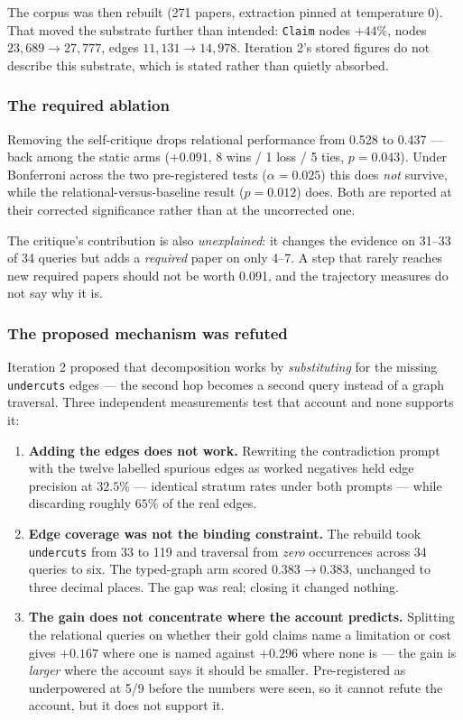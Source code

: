 The corpus was then rebuilt (271 papers, extraction pinned at temperature 0).
That moved the substrate further than intended: \texttt{Claim} nodes $+44\%$,
nodes $23{,}689 \rightarrow 27{,}777$, edges $11{,}131 \rightarrow 14{,}978$.
Iteration 2's stored figures do not describe this substrate, which is stated
rather than quietly absorbed.

\subsubsection*{The required ablation}

Removing the self-critique drops relational performance from 0.528 to 0.437 ---
back among the static arms ($+0.091$, 8 wins / 1 loss / 5 ties, $p = 0.043$).
Under Bonferroni across the two pre-registered tests ($\alpha = 0.025$) this
does \emph{not} survive, while the relational-versus-baseline result
($p = 0.012$) does. Both are reported at their corrected significance rather
than at the uncorrected one.

The critique's contribution is also \emph{unexplained}: it changes the
evidence on 31--33 of 34 queries but adds a \emph{required} paper on only
4--7. A step that rarely reaches new required papers should not be worth
0.091, and the trajectory measures do not say why it is.

\subsubsection*{The proposed mechanism was refuted}

Iteration 2 proposed that decomposition works by \emph{substituting} for the
missing \texttt{undercuts} edges --- the second hop becomes a second query
instead of a graph traversal. Three independent measurements test that
account and none supports it:

\begin{enumerate}[label=(\alph*)]
  \item \textbf{Adding the edges does not work.} Rewriting the contradiction
        prompt with the twelve labelled spurious edges as worked negatives held
        edge precision at $32.5\%$ --- identical stratum rates under both
        prompts --- while discarding roughly $65\%$ of the real edges.
  \item \textbf{Edge coverage was not the binding constraint.} The rebuild took
        \texttt{undercuts} from 33 to 119 and traversal from \emph{zero}
        occurrences across 34 queries to six. The typed-graph arm scored
        $0.383 \rightarrow 0.383$, unchanged to three decimal places. The gap
        was real; closing it changed nothing.
  \item \textbf{The gain does not concentrate where the account predicts.}
        Splitting the relational queries on whether their gold claims name a
        limitation or cost gives $+0.167$ where one is named against $+0.296$
        where none is --- the gain is \emph{larger} where the account says it
        should be smaller. Pre-registered as underpowered at 5/9 before the
        numbers were seen, so it cannot refute the account, but it does not
        support it.
\end{enumerate}

